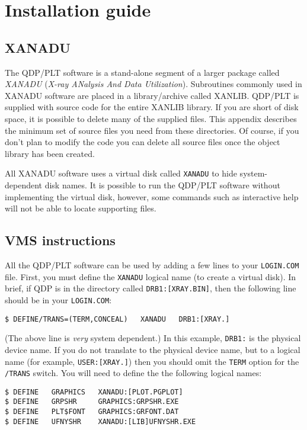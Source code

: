 \chapter{Installation guide}
\label{install}

\section{XANADU}
The QDP/PLT software is a stand-alone segment of a larger package
called {\em XANADU} ({\em X-ray ANalysis And Data Utilization}).
Subroutines commonly used in XANADU software are placed in a
library/archive called XANLIB.
QDP/PLT is supplied with source code for the entire XANLIB library.
If you are short of disk space, it is possible to delete many of
the supplied files.
This appendix describes the minimum set of source files you need from
these directories.
Of course, if you don't plan to modify the code you can delete all
source files once the object library has been created.

All XANADU software uses a virtual disk called {\tt XANADU} to hide
system-dependent disk names.
It is possible to run the QDP/PLT software without implementing
the virtual disk, however, some commands such as interactive help
will not be able to locate supporting files.

\section{VMS instructions}
All the QDP/PLT software can be used
by adding a few lines to your {\tt LOGIN.COM} file.
First, you must define the {\tt XANADU} logical name
(to create a virtual disk).
In brief, if QDP is in the directory called {\tt DRB1:[XRAY.BIN]},
then the following line should be in your {\tt LOGIN.COM}:
\begin{verbatim}
$ DEFINE/TRANS=(TERM,CONCEAL)   XANADU   DRB1:[XRAY.]
\end{verbatim}
(The above line is {\em very} system dependent.)
In this example, {\tt DRB1:} is the physical device name.
If you do not translate to the physical device name,
but to a logical name (for example, {\tt USER:[XRAY.]})
then you should omit the {\tt TERM} option for the {\tt /TRANS} switch.
You will need to define the the following logical names:

\begin{verbatim}
$ DEFINE   GRAPHICS   XANADU:[PLOT.PGPLOT]
$ DEFINE   GRPSHR     GRAPHICS:GRPSHR.EXE
$ DEFINE   PLT$FONT   GRAPHICS:GRFONT.DAT
$ DEFINE   UFNYSHR    XANADU:[LIB]UFNYSHR.EXE
\end{verbatim}

